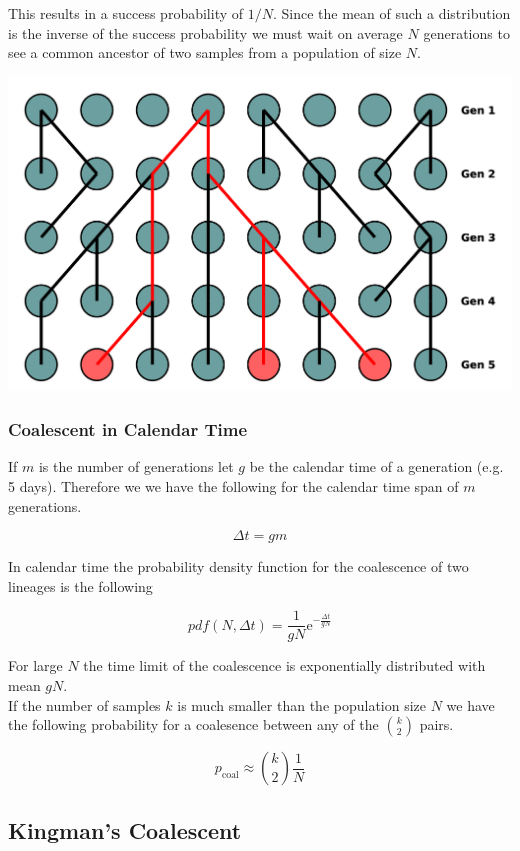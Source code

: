 \documentclass{article}
\begin{document}
\begin{multicols*}{3}
This results in a success probability of $1/N$. Since the mean of such a distribution is the inverse of the success probability we must wait on average $N$ generations to see a common ancestor of two samples from a population of size $N$. 

\begin{center}
    \includegraphics[width=1\linewidth, angle=0.0]{wfphylo.png}
\end{center}

\subsubsection{Coalescent in Calendar Time}

If $m$ is the number of generations let $g$ be the calendar time of a generation (e.g. 5 days). Therefore we we have the following for the calendar time span of $m$ generations. 

$$\Delta t = gm$$

In calendar time the probability density function for the coalescence of two lineages is the following 

$$pdf(N, \Delta t) = \frac{1}{gN}\text{e}^{-\frac{\Delta t}{gN}}$$

For large $N$ the time limit of the coalescence is exponentially distributed with mean $gN$.\\

If the number of samples $k$ is much smaller than the population size $N$ we have the following probability for a coalesence between any of the ${k\choose 2 }$ pairs. 

$$p_{\text{coal}} \approx {k\choose2}\frac{1}{N}$$


\subsection{Kingman's Coalescent}


\end{multicols*}
\end{document}
